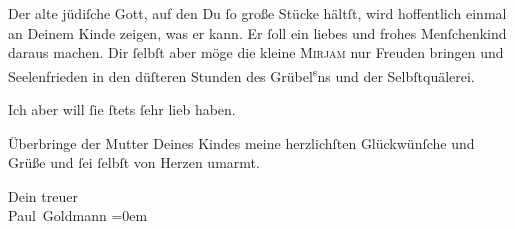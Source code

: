 \pstart
           Der alte jüdiſche Gott, auf den Du{ }ſo große Stücke hältſt,  wird hoffentlich einmal an Deinem Kinde zeigen, was er kann. Er{ }ſoll
               ein {\pb}liebes und frohes Menſchenkind daraus
               machen. Dir{ }ſelbſt aber möge die kleine \textsc{Mirjam}{ } nur Freuden bringen und Seelenfrieden in den düſteren Stunden des Grübel\substVorne{}\textsuperscript{s}\substDazwischen{}n\substHinten{}s und der Selbſtquälerei.\pend
           
\pstart
           Ich \strikeout{\textcolor{gray}{×}\-\textcolor{gray}{×}\-\textcolor{gray}{×}\-\textcolor{gray}{×}} aber will{ }ſie{ }ſtets{ }ſehr lieb haben.\pend
           
\pstart
           Überbringe der Mutter Deines
                  Kindes meine herzlichſten
               Glückwünſche und Grüße und{ }ſei{ }ſelbſt von Herzen umarmt.\pend
           
\pstart
           Dein treuer{\\[\baselineskip]}\spacefill\mbox{Paul Goldmann}\pend
           \leftskip=0em{}\endnumbering{}  \newcommand{\dateiname}{L02823}\newcommand{\titel}{Paul Goldmann an Arthur Schnitzler, 13. 9. 1897}\newcommand{\editorInnen}{Martin Anton Müller und Laura Untner}

